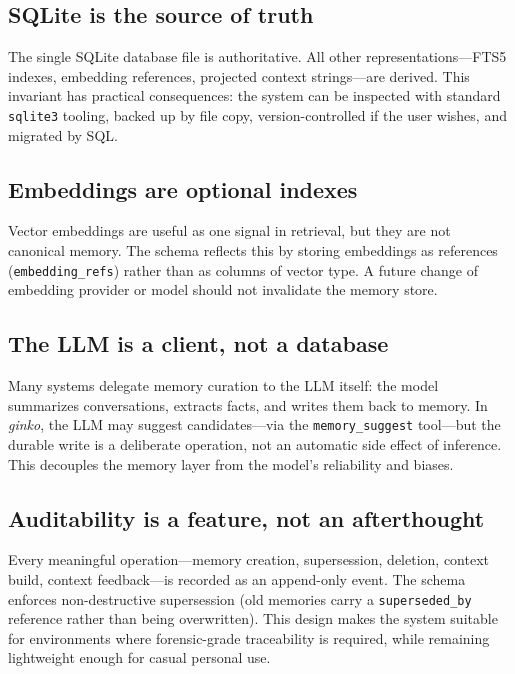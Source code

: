 \documentclass[11pt,a4paper]{article}
\begin{document}
\subsection{SQLite is the source of truth}

The single SQLite database file is authoritative. All other representations---FTS5 indexes, embedding references, projected context strings---are derived. This invariant has practical consequences: the system can be inspected with standard \texttt{sqlite3} tooling, backed up by file copy, version-controlled if the user wishes, and migrated by SQL.

\subsection{Embeddings are optional indexes}

Vector embeddings are useful as one signal in retrieval, but they are not canonical memory. The schema reflects this by storing embeddings as references (\texttt{embedding\_refs}) rather than as columns of vector type. A future change of embedding provider or model should not invalidate the memory store.

\subsection{The LLM is a client, not a database}

Many systems delegate memory curation to the LLM itself: the model summarizes conversations, extracts facts, and writes them back to memory. In \textit{ginko}, the LLM may suggest candidates---via the \texttt{memory\_suggest} tool---but the durable write is a deliberate operation, not an automatic side effect of inference. This decouples the memory layer from the model's reliability and biases.

\subsection{Auditability is a feature, not an afterthought}

Every meaningful operation---memory creation, supersession, deletion, context build, context feedback---is recorded as an append-only event. The schema enforces non-destructive supersession (old memories carry a \texttt{superseded\_by} reference rather than being overwritten). This design makes the system suitable for environments where forensic-grade traceability is required, while remaining lightweight enough for casual personal use.
\end{document}
